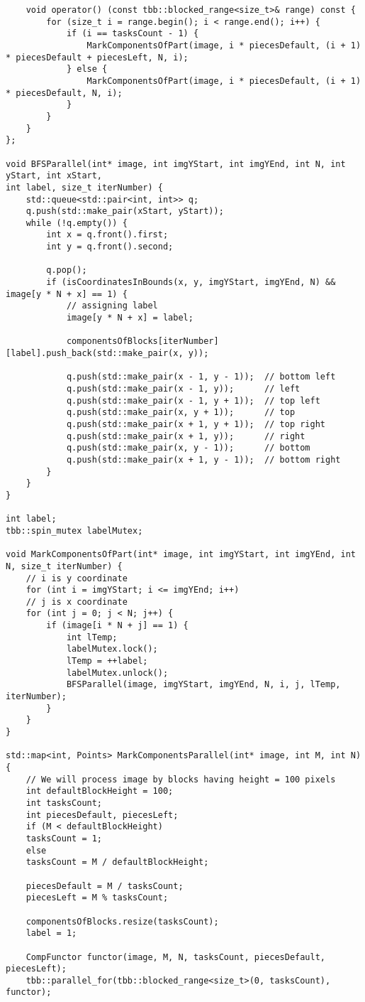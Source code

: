 \documentclass[14pt, russian]{extarticle}
\begin{document}
\begin{lstlisting}
	void operator() (const tbb::blocked_range<size_t>& range) const {
		for (size_t i = range.begin(); i < range.end(); i++) {
			if (i == tasksCount - 1) {
				MarkComponentsOfPart(image, i * piecesDefault, (i + 1) * piecesDefault + piecesLeft, N, i);
			} else {
				MarkComponentsOfPart(image, i * piecesDefault, (i + 1) * piecesDefault, N, i);
			}
		}
	}
};

void BFSParallel(int* image, int imgYStart, int imgYEnd, int N, int yStart, int xStart,
int label, size_t iterNumber) {
	std::queue<std::pair<int, int>> q;
	q.push(std::make_pair(xStart, yStart));
	while (!q.empty()) {
		int x = q.front().first;
		int y = q.front().second;
		
		q.pop();
		if (isCoordinatesInBounds(x, y, imgYStart, imgYEnd, N) && image[y * N + x] == 1) {
			// assigning label
			image[y * N + x] = label;
			
			componentsOfBlocks[iterNumber][label].push_back(std::make_pair(x, y));
			
			q.push(std::make_pair(x - 1, y - 1));  // bottom left
			q.push(std::make_pair(x - 1, y));      // left
			q.push(std::make_pair(x - 1, y + 1));  // top left
			q.push(std::make_pair(x, y + 1));      // top
			q.push(std::make_pair(x + 1, y + 1));  // top right
			q.push(std::make_pair(x + 1, y));      // right
			q.push(std::make_pair(x, y - 1));      // bottom
			q.push(std::make_pair(x + 1, y - 1));  // bottom right
		}
	}
}

int label;
tbb::spin_mutex labelMutex;

void MarkComponentsOfPart(int* image, int imgYStart, int imgYEnd, int N, size_t iterNumber) {
	// i is y coordinate
	for (int i = imgYStart; i <= imgYEnd; i++)
	// j is x coordinate
	for (int j = 0; j < N; j++) {
		if (image[i * N + j] == 1) {
			int lTemp;
			labelMutex.lock();
			lTemp = ++label;
			labelMutex.unlock();
			BFSParallel(image, imgYStart, imgYEnd, N, i, j, lTemp, iterNumber);
		}
	}
}

std::map<int, Points> MarkComponentsParallel(int* image, int M, int N) {
	// We will process image by blocks having height = 100 pixels
	int defaultBlockHeight = 100;
	int tasksCount;
	int piecesDefault, piecesLeft;
	if (M < defaultBlockHeight)
	tasksCount = 1;
	else
	tasksCount = M / defaultBlockHeight;
	
	piecesDefault = M / tasksCount;
	piecesLeft = M % tasksCount;
	
	componentsOfBlocks.resize(tasksCount);
	label = 1;
	
	CompFunctor functor(image, M, N, tasksCount, piecesDefault, piecesLeft);
	tbb::parallel_for(tbb::blocked_range<size_t>(0, tasksCount), functor);
	

\end{lstlisting}
\end{document}
